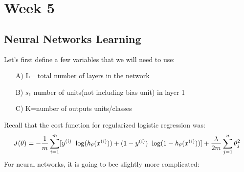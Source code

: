 \chapter{Week 5}
\section{Neural Networks Learning}
Let's first define a few variables that we will need to use:
\begin{itemize}
	\item[A)] L= total number of layers in the network
	\item[B)] $s_1$ number of units(not including bias unit) in layer 1
	\item[C)] K=number of outputs units/classes
\end{itemize}
Recall that the cost function for regularized logistic regression was:
\begin{equation}
J(\theta) = - \frac{1}{m} \sum_{i=1}^m \large[ y^{(i)}\ \log (h_\theta (x^{(i)})) + (1 - y^{(i)})\ \log (1 - h_\theta(x^{(i)}))\large] + \frac{\lambda}{2m}\sum_{j=1}^n \theta_j^2
\end{equation}
For neural  networks, it is going to bee slightly more complicated:
